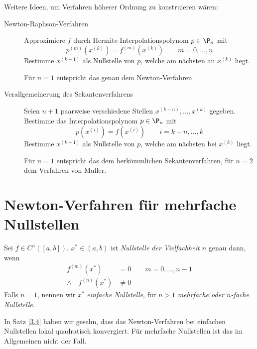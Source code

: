 \documentclass[11pt]{scrbook}
\begin{document}
Weitere Ideen, um Verfahren höherer Ordnung zu konstruieren wären:
\begin{description}
	\item[Newton-Raphson-Verfahren]
		Approximiere $f$ durch Hermite-Interpolationspolynom $p\in \P_n$ mit 
		\[
			p^{(m)}(x^{(k)}) = f^{(m)}(x^{(k)}) \qquad m=0,\dotsc,n
		\]
		Bestimme $x^{(k+1)}$ als Nullstelle von $p$, welche am nächsten an $x^{(k)}$ liegt.

		Für $n=1$ entspricht das genau dem Newton-Verfahren.
	\item[Verallgemeinerung des Sekantenverfahrens]
		Seien $n+1$ paarweise verschiedene Stellen $x^{(k-n)}, \dotsc, x^{(k)}$ gegeben.
		Bestimme das Interpolationspolynom $p\in \P_n$ mit
		\[
			p(x^{(i)}) = f(x^{(i)}) \qquad i=k-n,\dotsc,k
		\]
		Bestimme $x^{(k+1)}$ als Nullstelle von $p$, welche am nächsten bei $x^{(k)}$ liegt.

		Für $n=1$ entspricht das dem herkömmlichen Sekantenverfahren, für $n=2$ dem Verfahren von Muller.
\end{description}


\section{Newton-Verfahren für mehrfache Nullstellen}

\begin{df} \label{3.14}
	Sei $f\in C^n ([a,b])$.
	$x^* \in (a,b)$ ist \emph{Nullstelle der Vielfachheit $n$} genau dann, wenn
	\begin{align*}
		f^{(m)}(x^*) &= 0 \qquad m=0,\dotsc,n-1 \\
		\land\quad f^{(n)}(x^*) &\neq 0
	\end{align*}
	Falls $n=1$, nennen wir $x^*$ \emph{einfache Nullstelle}, für $n>1$ \emph{mehrfache oder $n$-fache Nullstelle}.
\end{df}

\begin{nt*}
	In Satz \ref{3.4} haben wir gesehn, dass das Newton-Verfahren bei einfachen Nullstellen lokal quadratisch konvergiert.
	Für mehrfache Nullstellen ist das im Allgemeinen nicht der Fall.
\end{nt*}
\end{document}
